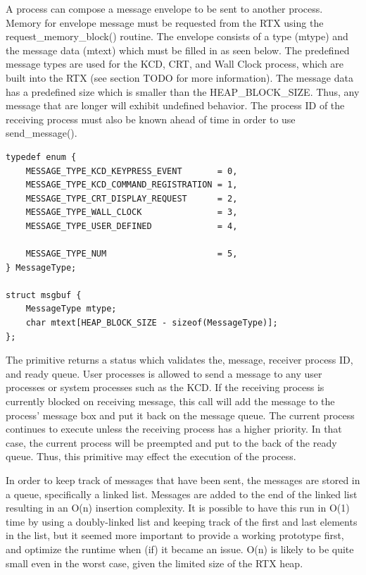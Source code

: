 \documentclass[12pt]{report}
\begin{document}
\par A process can compose a message envelope to be sent to another process. Memory for envelope message must be requested from the RTX using the request\_memory\_block() routine. The envelope consists of a type (mtype) and the message data (mtext) which must be filled in as seen below. The predefined message types are used for the KCD, CRT, and Wall Clock process, which are built into the RTX (see section TODO for more information). The message data has a predefined size which is smaller than the HEAP\_BLOCK\_SIZE. Thus, any message that are longer will exhibit undefined behavior. The process ID of the receiving process must also be known ahead of time in order to use send\_message().
\newline
\begin{lstlisting}
typedef enum {
    MESSAGE_TYPE_KCD_KEYPRESS_EVENT       = 0,
    MESSAGE_TYPE_KCD_COMMAND_REGISTRATION = 1,
    MESSAGE_TYPE_CRT_DISPLAY_REQUEST      = 2,
    MESSAGE_TYPE_WALL_CLOCK               = 3,
    MESSAGE_TYPE_USER_DEFINED             = 4,

    MESSAGE_TYPE_NUM                      = 5,
} MessageType;

struct msgbuf {
    MessageType mtype;
    char mtext[HEAP_BLOCK_SIZE - sizeof(MessageType)];
};
\end{lstlisting}
\par The primitive returns a status which validates the, message, receiver process ID, and ready queue. User processes is allowed to send a message to any user processes or system processes such as the KCD. If the receiving process is currently blocked on receiving message, this call will add the message to the process' message box and put it back on the message queue. The current process continues to execute unless the receiving process has a higher priority. In that case, the current process will be preempted and put to the back of the ready queue. Thus, this primitive may effect the execution of the process.

\par In order to keep track of messages that have been sent, the messages are stored in a queue, specifically a linked list. Messages are added to the end of the linked list resulting in an O(n) insertion complexity. It is possible to have this run in O(1) time by using a doubly-linked list and keeping track of the first and last elements in the list, but it seemed more important to provide a working prototype first, and optimize the runtime when (if) it became an issue. O(n) is likely to be quite small even in the worst case, given the limited size of the RTX heap.
\newline
\end{document}

